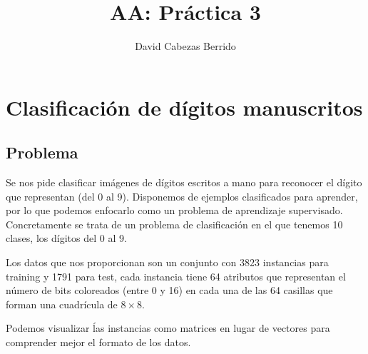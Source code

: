 \documentclass[a4]{article}
\title{AA: Práctica 3}
\author{David Cabezas Berrido}
\date{}
\begin{document}
\maketitle
\tableofcontents

\section{Clasificación de dígitos manuscritos}

\subsection{Problema}

Se nos pide clasificar imágenes de dígitos escritos a mano para
reconocer el dígito que representan (del 0 al 9). Disponemos de
ejemplos clasificados para aprender, por lo que podemos enfocarlo como
un problema de aprendizaje supervisado. Concretamente se trata de un
problema de clasificación en el que tenemos 10 clases, los dígitos del
0 al 9.

Los datos que nos proporcionan son un conjunto con 3823 instancias
para training y 1791 para test, cada instancia tiene 64 atributos que
representan el número de bits coloreados (entre 0 y 16) en cada una de
las 64 casillas que forman una cuadrícula de $8\times 8$.

Podemos visualizar ĺas instancias como matrices en lugar de vectores
para comprender mejor el formato de los datos.
\end{document}
